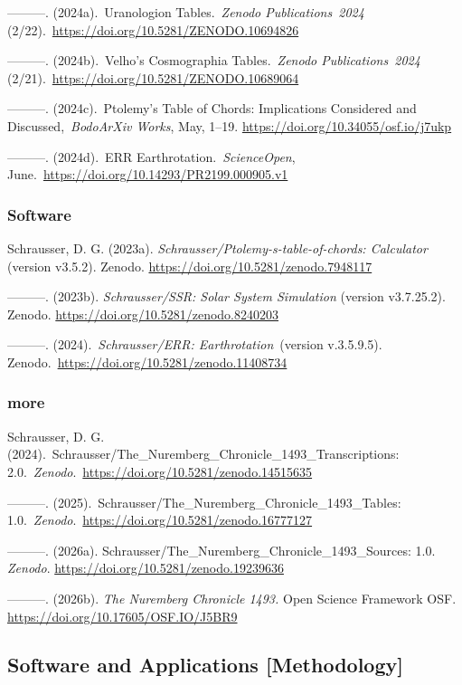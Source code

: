 \documentclass[
]{article}
\begin{document}
---------. (2024a).~Uranologion Tables.~\emph{Zenodo Publications~2024}
(2/22).~\url{https://doi.org/10.5281/ZENODO.10694826}

---------. (2024b).~Velho's Cosmographia Tables.~\emph{Zenodo
Publications~2024} (2/21).~\url{https://doi.org/10.5281/ZENODO.10689064}

---------. (2024c).~Ptolemy's Table of Chords: Implications Considered
and Discussed,~\emph{BodoArXiv Works}, May, 1--19.
\url{https://doi.org/10.34055/osf.io/j7ukp}

---------. (2024d).~ERR Earthrotation.~\emph{ScienceOpen},
June.~\url{https://doi.org/10.14293/PR2199.000905.v1}

\hypertarget{software-4}{%
\subsubsection{Software}\label{software-4}}

Schrausser, D. G. (2023a). \emph{Schrausser/Ptolemy-s-table-of-chords:
Calculator} (version v3.5.2). Zenodo.
\url{https://doi.org/10.5281/zenodo.7948117}

---------. (2023b). \emph{Schrausser/SSR: Solar System Simulation}
(version v3.7.25.2). Zenodo.
\url{https://doi.org/10.5281/zenodo.8240203}

---------. (2024).~\emph{Schrausser/ERR: Earthrotation}~(version
v.3.5.9.5). Zenodo.~\url{https://doi.org/10.5281/zenodo.11408734}

\hypertarget{more-3}{%
\subsubsection{more}\label{more-3}}

Schrausser, D. G.
(2024).~Schrausser/The\_Nuremberg\_Chronicle\_1493\_Transcriptions:
2.0.~\emph{Zenodo}.~\url{https://doi.org/10.5281/zenodo.14515635}

---------. (2025).~Schrausser/The\_Nuremberg\_Chronicle\_1493\_Tables:
1.0.~\emph{Zenodo}.~\url{https://doi.org/10.5281/zenodo.16777127}

---------. (2026a). Schrausser/The\_Nuremberg\_Chronicle\_1493\_Sources:
1.0. \emph{Zenodo}. \url{https://doi.org/10.5281/zenodo.19239636}

---------. (2026b). \emph{The Nuremberg Chronicle 1493.} Open Science
Framework OSF. \url{https://doi.org/10.17605/OSF.IO/J5BR9}

\hypertarget{software-and-applications-methodology}{%
\subsection{Software and Applications
{[}Methodology{]}}\label{software-and-applications-methodology}}
\end{document}
